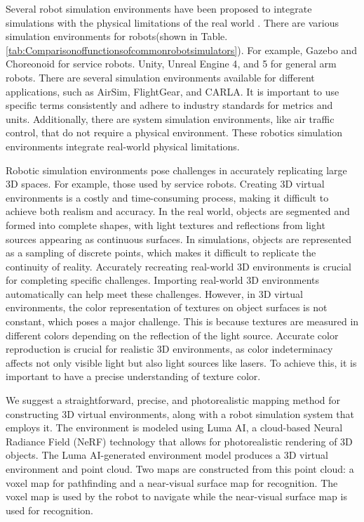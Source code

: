 Several robot simulation environments have been proposed to integrate simulations with the physical limitations of the real world \cite{collins2021review}.  There are various simulation environments for robots(shown in Table.\ref{tab:Comparisonoffunctionsofcommonrobotsimulators}). For example, Gazebo\cite{koenig2004design} and Choreonoid\cite{nakaoka2012choreonoid} for service robots. Unity\cite{unity2023}, Unreal Engine 4\cite{unrealengine4}, and 5\cite{unreal2023engine} for general arm robots. There are several simulation environments available for different applications, such as AirSim\cite{shah2018airsim}, FlightGear\cite{sorton2005simulated}, and CARLA. It is important to use specific terms consistently and adhere to industry standards for metrics and units. Additionally, there are system simulation environments, like air traffic control, that do not require a physical environment.  These robotics simulation environments integrate real-world physical limitations.
\singlespacing

Robotic simulation environments pose challenges in accurately replicating large 3D spaces. For example, those used by service robots. Creating 3D virtual environments is a costly and time-consuming process, making it difficult to achieve both realism and accuracy\cite{connolly2021realistic}\cite{byravan2023nerf2real}. In the real world, objects are segmented and formed into complete shapes, with light textures and reflections from light sources appearing as continuous surfaces. In simulations, objects are represented as a sampling of discrete points, which makes it difficult to replicate the continuity of reality\cite{slater2002computer}.
\singlespacing
Accurately recreating real-world 3D environments is crucial for completing specific challenges. Importing real-world 3D environments automatically can help meet these challenges\cite{Liu2017Design}. However, in 3D virtual environments, the color representation of textures on object surfaces is not constant, which poses a major challenge. This is because textures are measured in different colors depending on the reflection of the light source. Accurate color reproduction is crucial for realistic 3D environments, as color indeterminacy affects not only visible light but also light sources like lasers. To achieve this, it is important to have a precise understanding of texture color.
\singlespacing

 We suggest a straightforward, precise, and photorealistic mapping method for constructing 3D virtual environments, along with a robot simulation system that employs it. The environment is modeled using Luma AI\cite{luma2023unreal}, a cloud-based Neural Radiance Field (NeRF)\cite{mildenhall2020nerf} technology that allows for photorealistic rendering of 3D objects. The Luma AI-generated environment model produces a 3D virtual environment and point cloud. Two maps are constructed from this point cloud: a voxel map for pathfinding and a near-visual surface map for recognition. The voxel map is used by the robot to navigate while the near-visual surface map is used for recognition.
\singlespacing

